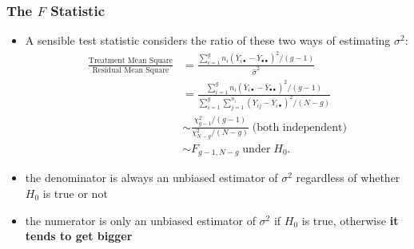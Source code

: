 \documentclass[a4paper]{article}
\begin{document}
\subsubsection{The \( F \) Statistic}
\begin{itemize}
	\item A sensible test statistic considers the ratio of these two ways of estimating \( \sigma^2 \):
	\begin{align*}
	\frac{\text{Treatment Mean Square}}{\text{Residual Mean Square}} &= \frac{\sum_{i=1}^gn_i(\overline Y_{i\bullet}-\overline Y_{\bullet\bullet})^2/(g-1)}{\hat{\sigma}^2}\\
	& =  \frac{\sum_{i=1}^gn_i(\overline Y_{i\bullet}-\overline Y_{\bullet\bullet})^2/(g-1)}{\sum_{i=1}^g\sum_{j=1}^{n_i}(Y_{ij}-\overline Y_{i\bullet})^2/(N-g)}\\
	& \sim \frac{\chi^2_{g-1}/(g-1)}{\chi^2_{N-g}/(N-g)} \;\text{(both independent)}\\
	& \sim F_{g-1,N-g} \;\text{under}\;H_0.
	\end{align*}
	\item the denominator is always an unbiased estimator of \( \sigma^2 \) regardless of whether \( H_0 \) is true or not
	\item the numerator is only an unbiased estimator of \( \sigma^2 \) if \( H_0 \) is true, otherwise \textbf{it tends to get bigger}
\end{itemize}
\end{document}

